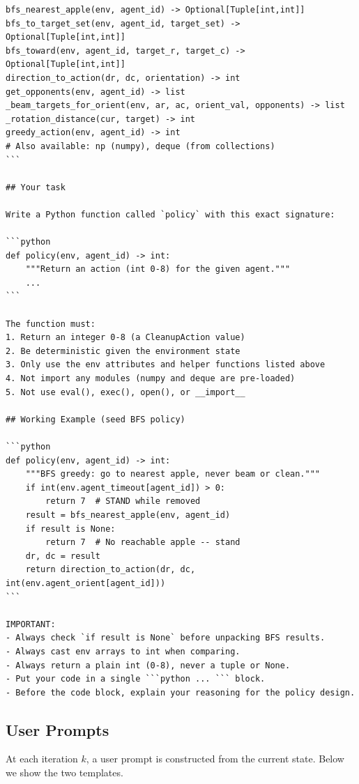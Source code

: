 \documentclass{nextgame2026} %
\begin{document}
\begin{lstlisting}[style=pysmall, caption={Cleanup system prompt (verbatim).}, basicstyle=\ttfamily\tiny]
bfs_nearest_apple(env, agent_id) -> Optional[Tuple[int,int]]
bfs_to_target_set(env, agent_id, target_set) -> Optional[Tuple[int,int]]
bfs_toward(env, agent_id, target_r, target_c) -> Optional[Tuple[int,int]]
direction_to_action(dr, dc, orientation) -> int
get_opponents(env, agent_id) -> list
_beam_targets_for_orient(env, ar, ac, orient_val, opponents) -> list
_rotation_distance(cur, target) -> int
greedy_action(env, agent_id) -> int
# Also available: np (numpy), deque (from collections)
```

## Your task

Write a Python function called `policy` with this exact signature:

```python
def policy(env, agent_id) -> int:
    """Return an action (int 0-8) for the given agent."""
    ...
```

The function must:
1. Return an integer 0-8 (a CleanupAction value)
2. Be deterministic given the environment state
3. Only use the env attributes and helper functions listed above
4. Not import any modules (numpy and deque are pre-loaded)
5. Not use eval(), exec(), open(), or __import__

## Working Example (seed BFS policy)

```python
def policy(env, agent_id) -> int:
    """BFS greedy: go to nearest apple, never beam or clean."""
    if int(env.agent_timeout[agent_id]) > 0:
        return 7  # STAND while removed
    result = bfs_nearest_apple(env, agent_id)
    if result is None:
        return 7  # No reachable apple -- stand
    dr, dc = result
    return direction_to_action(dr, dc, int(env.agent_orient[agent_id]))
```

IMPORTANT:
- Always check `if result is None` before unpacking BFS results.
- Always cast env arrays to int when comparing.
- Always return a plain int (0-8), never a tuple or None.
- Put your code in a single ```python ... ``` block.
- Before the code block, explain your reasoning for the policy design.
\end{lstlisting}


\subsection{User Prompts}
\label{app:prompt-user}

At each iteration $k$, a user prompt is constructed from the current
state.  Below we show the two templates.
\end{document}
